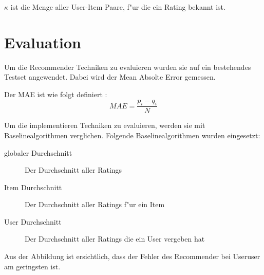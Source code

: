 \documentclass[a4paper, 11pt]{article}
\begin{document}
$\kappa$ ist die Menge aller User-Item Paare, f"ur die ein Rating bekannt ist.

\section{Evaluation}
\label{sec:evaluation}

Um die Recommender Techniken zu evaluieren wurden sie auf ein bestehendes Testset angewendet. Dabei wird der Mean Absolte Error gemessen.

Der MAE ist wie folgt definiert \cite{sarwar01}:
\begin{equation}
  \label{eq:mae}
  MAE = \frac{p_i-q_i}{N}
\end{equation}

Um die implementieren Techniken zu evaluieren, werden sie mit Baselinealgorithmen verglichen. 
Folgende Baselinealgorithmen wurden eingesetzt:
\begin{description}
\item[globaler Durchschnitt] Der Durchschnitt aller Ratings
\item[Item Durchschnitt] Der Durchschnitt aller Ratings f"ur ein Item
\item[User Durchschnitt] Der Durchschnitt aller Ratings die ein User vergeben hat
\end{description}



Aus der Abbildung ist ersichtlich, dass der Fehler des Recommender bei Useruser am geringsten ist.



\end{document}
